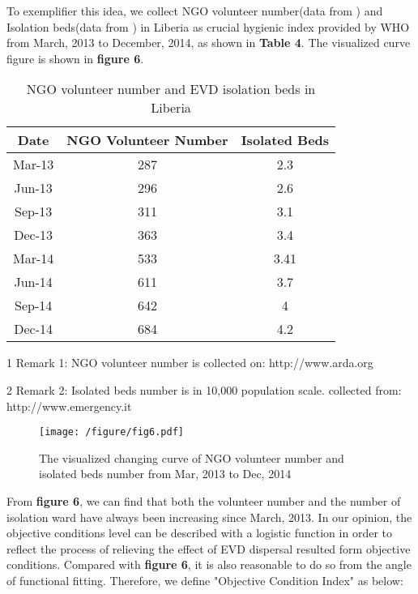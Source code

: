 To exemplifier this idea, we collect NGO volunteer number(data from \cite{nyenswah2014ebola,adraebola,emergencyebola}) and Isolation beds(data from \cite{adraebola,emergencyebola}) in Liberia as crucial hygienic index provided by WHO from March, 2013 to December, 2014, as shown in \textbf{Table 4}. The visualized curve figure is shown in \textbf{figure 6}.
\begin{table}[htbp]
\centering
\caption{NGO volunteer number and EVD isolation beds in Liberia} 
\begin{tabular}{|c|c|c|}
\hline
{\bf Date \tnote{1}} & {\bf NGO Volunteer Number \tnote{2}} & {\bf Isolated Beds} \\
\hline
    Mar-13 &        287 &        2.3 \\
\hline
    Jun-13 &        296 &        2.6 \\
\hline
    Sep-13 &        311 &        3.1 \\
\hline
    Dec-13 &        363 &        3.4 \\
\hline
    Mar-14 &        533 &       3.41 \\
\hline
    Jun-14 &        611 &        3.7 \\
\hline
    Sep-14 &        642 &          4 \\
\hline
    Dec-14 &        684 &        4.2 \\
\hline
\end{tabular}  
\begin{tablenotes}
        \footnotesize
        \item[1] Remark 1: NGO volunteer number is collected on: http://www.arda.org
        \item[2] Remark 2: Isolated beds number is in 10,000 population scale. collected from: http://www.emergency.it 
\end{tablenotes}

\end{table}

\begin{figure}[htbp]
\centering
\texttt{[image: /figure/fig6.pdf]}
\caption{The visualized changing curve of NGO volunteer number and isolated beds number from Mar, 2013 to Dec, 2014}\label{fig:6}
\end{figure}

From \textbf{figure 6}, we can find that both the volunteer number and the number of isolation ward have always been increasing since March, 2013. In our opinion, the objective conditions level can be described with a logistic function\cite{dowell1999transmission} in order to reflect the process of relieving the effect of EVD dispersal resulted form objective conditions. Compared with \textbf{figure 6}, it is also reasonable to do so from the angle of functional fitting. Therefore, we define "Objective Condition Index" as below:

